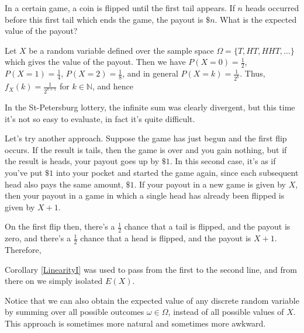 \begin{examp}
In a certain game, a coin is flipped until the first tail appears. If $n$ heads occurred before this first tail which ends the game, the payout is $\$n$. What is the expected value of the payout?
\par
\noindent Let $X$ be a random variable defined over the sample space $\Omega = \{T, HT, HHT, \dots\}$ which gives the value of the payout. Then we have $P(X = 0) = \frac{1}{2}$, $P(X = 1) = \frac{1}{4}$, $P(X = 2) = \frac{1}{8}$, and in general $P(X = k) = \frac{1}{2^k}$. Thus, $f_X(k) = \frac{1}{2^{k+1}}$ for $k \in \mathbb{N}$, and hence
\par
\noindent In the St-Petersburg lottery, the infinite sum was clearly divergent, but this time it's not so easy to evaluate, in fact it's quite difficult.
\par
\noindent Let's try another approach. Suppose the game has just begun and the first flip occurs. If the result is tails, then the game is over and you gain nothing, but if the result is heads, your payout goes up by $\$1$. In this second case, it's as if you've put $\$1$ into your pocket and started the game again, since each subsequent head also pays the same amount, $\$1$. If your payout in a new game is given by $X$, then your payout in a game in which a single head has already been flipped is given by $X+1$.
\par
\noindent On the first flip then, there's a $\frac{1}{2}$ chance that a tail is flipped, and the payout is zero, and there's a $\frac{1}{2}$ chance that a head is flipped, and the payout is $X+1$. Therefore,
\par
\noindent Corollary \ref{LinearityI} was used to pass from the first to the second line, and from there on we simply isolated $E(X)$.
\end{examp}
\par
Notice that we can also obtain the expected value of any discrete random variable by summing over all possible outcomes $\omega \in \Omega$, instead of all possible values of $X$. This approach is sometimes more natural and sometimes more awkward.
